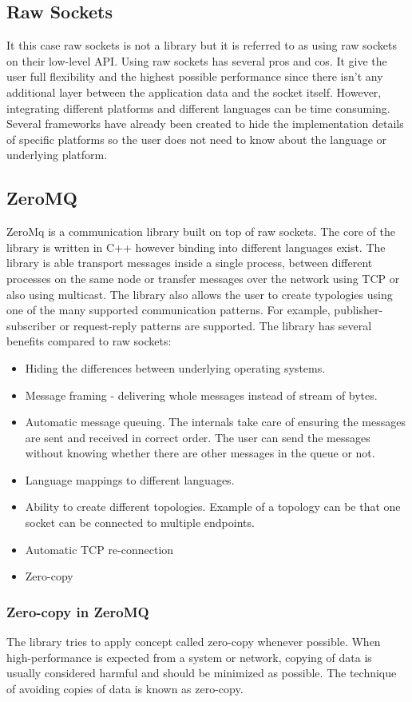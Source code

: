 \subsection{Raw Sockets}
It this case raw sockets is not a library but it is referred to as using raw sockets on their low-level API. Using raw sockets has several pros and cos. It give the user full flexibility and the highest possible performance since there isn't any additional layer between the application data and the socket itself. However, integrating different platforms and different languages can be time consuming. Several frameworks have already been created to hide the implementation details of specific platforms so the user does not need to know about the language or underlying platform.
\subsection{ZeroMQ}
ZeroMq is a communication library built on top of raw sockets. The core of the library is written in C++ however binding into different languages exist. The library is able transport messages inside a single process, between different processes on the same node or transfer messages over the network using TCP or also using multicast. The library also allows the user to create typologies using one of the many supported communication patterns. For example,  publisher-subscriber or request-reply patterns are supported. The library has several benefits compared to raw sockets:
\begin{itemize}
	\item Hiding the differences between underlying operating systems.
	\item Message framing - delivering whole messages instead of stream of bytes.
	\item Automatic message queuing. The internals take care of ensuring the messages are sent and received in correct order. The user can send the messages without knowing whether there are other messages in the queue or not.
	\item Language mappings to different languages.
	\item Ability to create different topologies. Example of a topology can be that one socket can be connected to multiple endpoints.
	\item Automatic TCP re-connection
	\item Zero-copy
\end{itemize}
\subsubsection{Zero-copy in ZeroMQ}
The library tries to apply concept called zero-copy whenever possible. When high-performance is expected from a system or network, copying of data is usually considered harmful and should be minimized as possible. The technique of avoiding copies of data is known as zero-copy.

